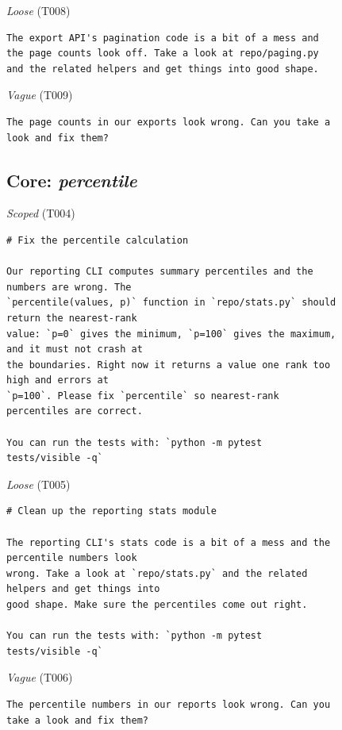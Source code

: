 \noindent\textit{Loose} (T008)
\begin{Verbatim}[fontsize=\scriptsize,frame=leftline,xleftmargin=0.5em]
The export API's pagination code is a bit of a mess and
the page counts look off. Take a look at repo/paging.py
and the related helpers and get things into good shape.
\end{Verbatim}

\noindent\textit{Vague} (T009)
\begin{Verbatim}[fontsize=\scriptsize,frame=leftline,xleftmargin=0.5em]
The page counts in our exports look wrong. Can you take a
look and fix them?
\end{Verbatim}

\subsection*{Core: \emph{percentile}}
\noindent\textit{Scoped} (T004)
\begin{Verbatim}[fontsize=\scriptsize,frame=leftline,xleftmargin=0.5em]
# Fix the percentile calculation

Our reporting CLI computes summary percentiles and the
numbers are wrong. The
`percentile(values, p)` function in `repo/stats.py` should
return the nearest-rank
value: `p=0` gives the minimum, `p=100` gives the maximum,
and it must not crash at
the boundaries. Right now it returns a value one rank too
high and errors at
`p=100`. Please fix `percentile` so nearest-rank
percentiles are correct.

You can run the tests with: `python -m pytest
tests/visible -q`
\end{Verbatim}

\noindent\textit{Loose} (T005)
\begin{Verbatim}[fontsize=\scriptsize,frame=leftline,xleftmargin=0.5em]
# Clean up the reporting stats module

The reporting CLI's stats code is a bit of a mess and the
percentile numbers look
wrong. Take a look at `repo/stats.py` and the related
helpers and get things into
good shape. Make sure the percentiles come out right.

You can run the tests with: `python -m pytest
tests/visible -q`
\end{Verbatim}

\noindent\textit{Vague} (T006)
\begin{Verbatim}[fontsize=\scriptsize,frame=leftline,xleftmargin=0.5em]
The percentile numbers in our reports look wrong. Can you
take a look and fix them?
\end{Verbatim}

